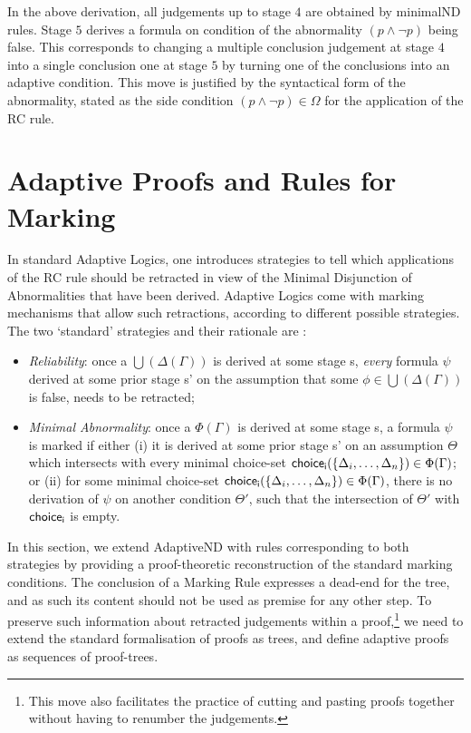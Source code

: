 \documentclass[]{article}
\begin{document}
In the above derivation, all judgements up to stage $4$ are obtained by {\sf minimalND} rules. Stage $5$ derives a formula on condition of the abnormality $(p\wedge \neg p)$ being false.  This corresponds to changing a multiple conclusion judgement at stage $4$ into a single conclusion one at stage $5$ by turning one of the conclusions into an adaptive condition. This move is justified by the syntactical form of the abnormality, stated as the side condition $(p \wedge \neg p)\in \Omega$ for the application of the {\sf RC} rule.



\section{Adaptive Proofs and Rules for Marking}\label{sec:marking}

In standard Adaptive Logics, one introduces strategies to tell which applications of the {\sf RC} rule should be retracted in view of the Minimal Disjunction of Abnormalities that have been derived. Adaptive Logics come with marking mechanisms that allow such retractions, according to different possible strategies. The two `standard' strategies and their rationale are \cite{batens01}:

\begin{itemize}
    \item \textit{Reliability}: once a $\bigcup(\Delta(\Gamma))$ is derived at some stage {\sf s}, \textit{every} formula $\psi$ derived at some prior stage {\sf s'} on the assumption that some $\phi\in \bigcup(\Delta(\Gamma))$ is false, needs to be retracted;

\item \textit{Minimal Abnormality}: once a $\Phi(\Gamma)$ is derived at some stage {\sf s}, a formula $\psi$ is marked if either (i) it is derived at some prior stage {\sf s'} on an assumption $\Theta$ which intersects with every minimal choice-set ${\sf choice_{i}}(\{\Delta_{i}, \ldots, \Delta_{n}\})\in \Phi(\Gamma)$; or (ii) for some minimal choice-set ${\sf choice_{i}}(\{\Delta_{i}, \ldots, \Delta_{n}\})\in \Phi(\Gamma)$, there is no derivation of $\psi$ on another condition $\Theta'$, such that the intersection of $\Theta'$ with ${\sf choice_{i}}$ is empty.
\end{itemize}
%
In this section, we extend {\sf AdaptiveND} with rules corresponding to both strategies by providing a proof-theoretic reconstruction of the standard marking conditions. The conclusion of a Marking Rule expresses a dead-end for the tree, and as such its content should not be used as premise for any other step. To preserve such information about retracted judgements within a proof,\footnote{This move also facilitates the practice of cutting and pasting proofs together without having to renumber the judgements.} we need to extend the standard formalisation of proofs as trees, and define adaptive proofs as sequences of proof-trees.
\end{document}
